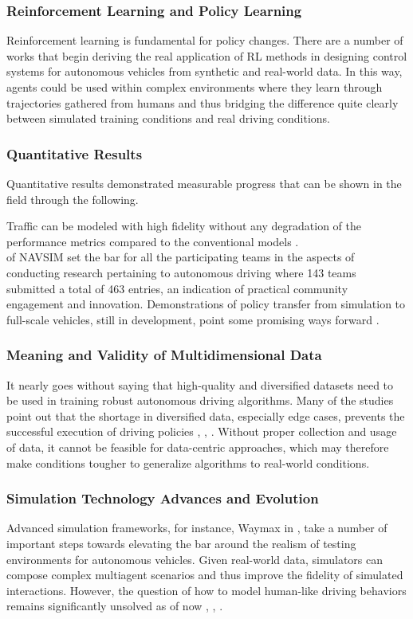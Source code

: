 \documentclass[lettersize,journal]{IEEEtran}
\begin{document}
\subsubsection{Reinforcement Learning and Policy Learning}
Reinforcement learning is fundamental for policy changes. There are a number of works that begin deriving the real application of RL methods in designing control systems for autonomous vehicles from synthetic and real-world data. In this way, agents could be used within complex environments where they learn through trajectories gathered from humans and thus bridging the difference quite clearly between simulated training conditions and real driving conditions.

\subsubsection{Quantitative Results}
Quantitative results demonstrated measurable progress that can be shown in the field through the following.

Traffic can be modeled with high fidelity without any degradation of the performance metrics compared to the conventional models \cite{ref2}.\\
\cite{ref6} of NAVSIM set the bar for all the participating teams in the aspects of conducting research pertaining to autonomous driving where 143 teams submitted a total of 463 entries, an indication of practical community engagement and innovation.
Demonstrations of policy transfer from simulation to full-scale vehicles, still in development, point some promising ways forward \cite{ref10}.

\subsubsection{Meaning and Validity of Multidimensional Data}
It nearly goes without saying that high-quality and diversified datasets need to be used in training robust autonomous driving algorithms. Many of the studies point out that the shortage in diversified data, especially edge cases, prevents the successful execution of driving policies \cite{ref2}, \cite{ref5}, \cite{ref5}. Without proper collection and usage of data, it cannot be feasible for data-centric approaches, which may therefore make conditions tougher to generalize algorithms to real-world conditions.

\subsubsection{Simulation Technology Advances and Evolution}
Advanced simulation frameworks, for instance, Waymax in \cite{ref4}, take a number of important steps towards elevating the bar around the realism of testing environments for autonomous vehicles. Given real-world data, simulators can compose complex multiagent scenarios and thus improve the fidelity of simulated interactions. However, the question of how to model human-like driving behaviors remains significantly unsolved as of now \cite{ref2}, \cite{ref4}, \cite{ref10}.
\end{document}
